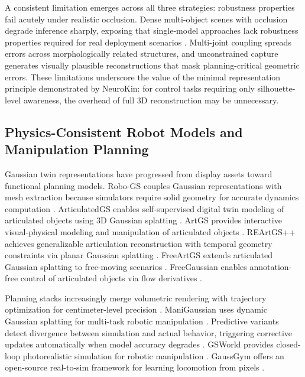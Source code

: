 \documentclass[12pt,a4paper,oneside]{report}
\begin{document}
A consistent limitation emerges across all three strategies: robustness properties fail acutely under realistic occlusion. Dense multi-object scenes with occlusion degrade inference sharply, exposing that single-model approaches lack robustness properties required for real deployment scenarios \cite{li2025art, zhang2025simart}. Multi-joint coupling spreads errors across morphologically related structures, and unconstrained capture generates visually plausible reconstructions that mask planning-critical geometric errors. These limitations underscore the value of the minimal representation principle demonstrated by NeuroKin: for control tasks requiring only silhouette-level awareness, the overhead of full 3D reconstruction may be unnecessary.
\subsection{Physics-Consistent Robot Models and Manipulation Planning}
\label{subsec:physics_consistent_robot_models_and_manipulation_planning}

Gaussian twin representations have progressed from display assets toward functional planning models. Robo-GS couples Gaussian representations with mesh extraction because simulators require solid geometry for accurate dynamics computation \cite{lou2024robogs}. ArticulatedGS enables self-supervised digital twin modeling of articulated objects using 3D Gaussian splatting \cite{guo2025articulatedgs}. ArtGS provides interactive visual-physical modeling and manipulation of articulated objects \cite{yu2025artgs}. REArtGS++ achieves generalizable articulation reconstruction with temporal geometry constraints via planar Gaussian splatting \cite{wu2025reartgs}. FreeArtGS extends articulated Gaussian splatting to free-moving scenarios \cite{dai2025freeartgs}. FreeGaussian enables annotation-free control of articulated objects via flow derivatives \cite{chen2025freegaussian}.

Planning stacks increasingly merge volumetric rendering with trajectory optimization for centimeter-level precision \cite{sun2026digitaltwin}. ManiGaussian uses dynamic Gaussian splatting for multi-task robotic manipulation \cite{lu2024manigaussian}. Predictive variants detect divergence between simulation and actual behavior, triggering corrective updates automatically when model accuracy degrades \cite{pan2025selfcorrecting}. GSWorld provides closed-loop photorealistic simulation for robotic manipulation \cite{jiang2025gsworld}. GaussGym offers an open-source real-to-sim framework for learning locomotion from pixels \cite{escontrela2025gaussgym}.
\end{document}
